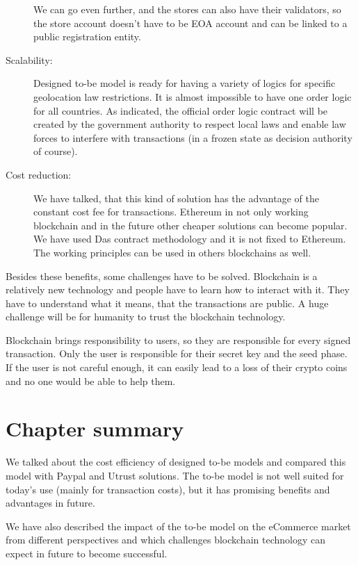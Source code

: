 \documentclass[thesis=M,english]{FITthesis}[2019/12/23]
\begin{document}
\begin{description}
We can go even further, and the stores can also have their validators, so the store account doesn't have to be EOA account and can be linked to a public registration entity. 

\item[Scalability:]  Designed to-be model is ready for having a variety of logics for specific geolocation law restrictions. It is almost impossible to have one order logic for all countries. As indicated, the official order logic contract will be created by the government authority to respect local laws and enable law forces to interfere with transactions (in a frozen state as decision authority of course).

\item[Cost reduction:] We have talked, that this kind of solution has the advantage of the constant cost fee for transactions. Ethereum in not only working blockchain and in the future other cheaper solutions can become popular. We have used Das contract methodology and it is not fixed to Ethereum. The working principles can be used in others blockchains as well.  

\end{description}

Besides these benefits, some challenges have to be solved. Blockchain is a relatively new technology and people have to learn how to interact with it. They have to understand what it means, that the transactions are public. A huge challenge will be for humanity to trust the blockchain technology.

Blockchain brings responsibility to users, so they are responsible for every signed transaction. Only the user is responsible for their secret key and the seed phase. If the user is not careful enough, it can easily lead to a loss of their crypto coins and no one would be able to help them.


\section{Chapter summary}
We talked about the cost efficiency of designed to-be models and compared this model with Paypal and Utrust solutions. The to-be model is not well suited for today's use (mainly for transaction costs), but it has promising benefits and advantages in future.

We have also described the impact of the to-be model on the eCommerce market from different perspectives and which challenges blockchain technology can expect in future to become successful.
\end{document}
